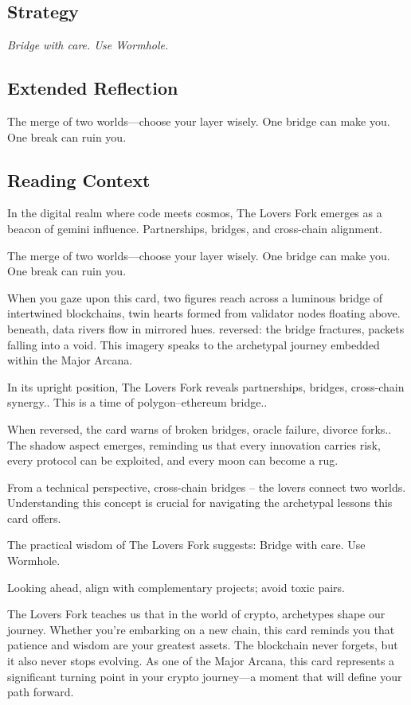 \documentclass[11pt,oneside]{book}
\begin{document}
\begin{minipage}[t]{0.55\textwidth}
  \subsection*{Strategy}
  \textit{Bridge with care. Use Wormhole.}

  \subsection*{Extended Reflection}
  The merge of two worlds—choose your layer wisely. One bridge can make you. One break can ruin you.

  \subsection*{Reading Context}
  In the digital realm where code meets cosmos, The Lovers Fork emerges as a beacon of gemini influence. Partnerships, bridges, and cross-chain alignment.

  The merge of two worlds—choose your layer wisely. One bridge can make you. One break can ruin you.

  When you gaze upon this card, two figures reach across a luminous bridge of intertwined blockchains, twin hearts formed from validator nodes floating above. beneath, data rivers flow in mirrored hues. reversed: the bridge fractures, packets falling into a void. This imagery speaks to the archetypal journey embedded within the Major Arcana.

  In its upright position, The Lovers Fork reveals partnerships, bridges, cross-chain synergy.. This is a time of polygon–ethereum bridge..

  When reversed, the card warns of broken bridges, oracle failure, divorce forks.. The shadow aspect emerges, reminding us that every innovation carries risk, every protocol can be exploited, and every moon can become a rug.

  From a technical perspective, cross-chain bridges – the lovers connect two worlds. Understanding this concept is crucial for navigating the archetypal lessons this card offers.

  The practical wisdom of The Lovers Fork suggests: Bridge with care. Use Wormhole.

  Looking ahead, align with complementary projects; avoid toxic pairs.

  The Lovers Fork teaches us that in the world of crypto, archetypes shape our journey. Whether you're embarking on a new chain, this card reminds you that patience and wisdom are your greatest assets. The blockchain never forgets, but it also never stops evolving. As one of the Major Arcana, this card represents a significant turning point in your crypto journey—a moment that will define your path forward.

\end{minipage}
\end{document}
